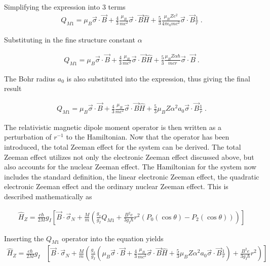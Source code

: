             \noindent Simplifying the expression into 3 terms 
            \begin{align}
                Q_{M1} = \mu_B \vec{\sigma} \cdot \vec{B} + \frac{4}{3}\frac{\mu_B}{mc^2}\vec{\sigma} \cdot \vec{B} \hat{H} + \frac{5}{3}\frac{\mu_B Ze^2}{4\pi \epsilon_0 mc^2}\vec{\sigma} \cdot \vec{B} \frac{1}{r}\;.
            \end{align}

            \noindent Substituting in the fine structure constant $\alpha$ 

            \begin{align}
                Q_{M1} = \mu_B \vec{\sigma} \cdot \vec{B} + \frac{4}{3}\frac{\mu_B}{mc^2}\vec{\sigma} \cdot \vec{B} \hat{H} + \frac{5}{3}\frac{\mu_B Z \alpha \hbar}{mcr}\vec{\sigma} \cdot \vec{B} \;.
            \end{align}

            \noindent The Bohr radius $a_0$ is also substituted into the expression, thus giving the final result

            \begin{align}
                Q_{M1} = \mu_B \vec{\sigma} \cdot \vec{B} + \frac{4}{3}\frac{\mu_B}{mc^2}\vec{\sigma} \cdot \vec{B} \hat{H} + \frac{5}{3}\mu_B Z \alpha^2 a_0 \vec{\sigma} \cdot \vec{B} \frac{1}{r} \;.
            \end{align}

            \noindent The relativistic magnetic dipole moment operator is then written as a perturbation of $r^{-1}$ to the Hamiltonian. Now that the operator has been introduced, the total Zeeman effect for the system can be derived. The total Zeeman effect utilizes not only the electronic Zeeman effect discussed above, but also accounts for the nuclear Zeeman effect. The Hamiltonian for the system now includes the standard definition, the linear electronic Zeeman effect, the quadratic electronic Zeeman effect and the ordinary nuclear Zeeman effect. This is described mathematically as 

            \begin{align}
                \hat{H}_Z = \frac{e\hbar}{2M} g_I  \left[ \vec{B} \cdot \vec{\sigma}_N + \frac{M}{m} \left(\frac{g_s}{g_I} Q_{M1} + \frac{B^2 e}{3g_I \hbar} r^2 \left( P_0(\cos \theta) - P_2(\cos\theta) \right) \right) \right]
            \end{align}

            \noindent Inserting the $Q_{M1}$ operator into the equation yields          
            \footnotesize
            \begin{align}
                \hat{H}_Z = \frac{e\hbar}{2M} g_I  &\left[ \vec{B} \cdot \vec{\sigma}_N + \frac{M}{m} \left(\frac{g_s}{g_I} \left( \mu_B \vec{\sigma} \cdot \vec{B} + \frac{4}{3}\frac{\mu_B}{mc^2}\vec{\sigma} \cdot \vec{B} \hat{H} + \frac{5}{3}\mu_B Z \alpha^2 a_0 \vec{\sigma} \cdot \vec{B} \frac{1}{r} \right) + \frac{B^2 e}{3g_I \hbar} r^2 \right) \right]
            \end{align}
            \normalsize


